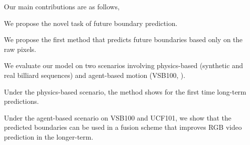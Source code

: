 Our main contributions are as follows, 
\begin{enumerate*}
    \item We propose the novel task of future boundary prediction.
    \item We propose the first method that predicts future boundaries based only on the raw pixels.
    \item We evaluate our model on two scenarios involving physics-based (synthetic and real billiard sequences) and agent-based motion (VSB100, \cite{galasso2013unified}).
    \item Under the physics-based scenario, the method shows for the first time long-term predictions.
    \item Under the agent-based scenario on VSB100 and UCF101, we show that the predicted boundaries can be used in a fusion scheme that improves RGB video prediction in the longer-term.
\end{enumerate*}